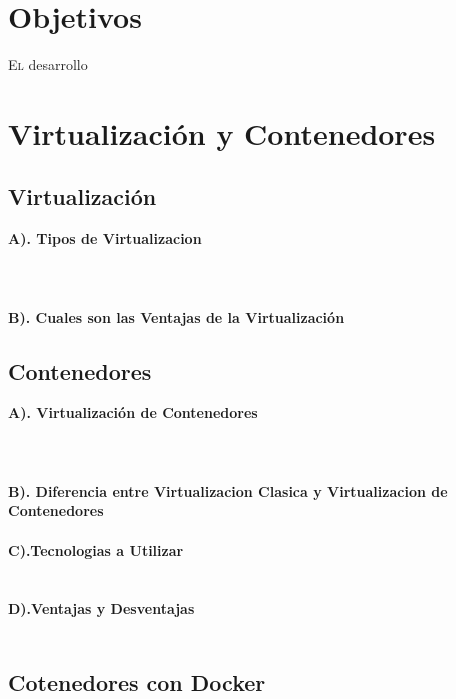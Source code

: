\documentclass[twoside,twocolumn]{article}
\begin{document}
\section{Objetivos}
\begin{flushright}
\begin{itemize}
\lettrine[nindent=0em,lines=2]{E}l desarrollo



\section{Virtualización y Contenedores}

\subsection{Virtualización}


 \textbf{A). Tipos de Virtualizacion }\\
\textbf{}\\
\textbf{}\\
\textbf{}\\
 \textbf{B). Cuales son las Ventajas de la Virtualización}\\





\subsection{Contenedores}
 \textbf{A). Virtualización de Contenedores }\\
\textbf{}\\
\textbf{}\\
\textbf{}\\
 \textbf{B). Diferencia entre Virtualizacion Clasica y Virtualizacion de Contenedores}\\
\textbf{}\\
 \textbf{C).Tecnologias a Utilizar}\\
\textbf{}\\
\textbf{}\\
 \textbf{D).Ventajas y Desventajas}\\
\textbf{}\\



\subsection{Cotenedores con Docker}


\end{itemize}
\end{flushright}
\end{document}
